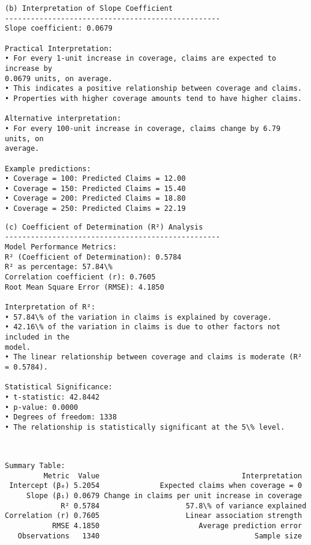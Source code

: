 \documentclass[8pt, twocolumn]{extarticle}
\begin{document}
    \begin{Verbatim}[commandchars=\\\{\}]
(b) Interpretation of Slope Coefficient
--------------------------------------------------
Slope coefficient: 0.0679

Practical Interpretation:
• For every 1-unit increase in coverage, claims are expected to increase by
0.0679 units, on average.
• This indicates a positive relationship between coverage and claims.
• Properties with higher coverage amounts tend to have higher claims.

Alternative interpretation:
• For every 100-unit increase in coverage, claims change by 6.79 units, on
average.

Example predictions:
• Coverage = 100: Predicted Claims = 12.00
• Coverage = 150: Predicted Claims = 15.40
• Coverage = 200: Predicted Claims = 18.80
• Coverage = 250: Predicted Claims = 22.19
    \end{Verbatim}
    \begin{Verbatim}[commandchars=\\\{\}]
(c) Coefficient of Determination (R²) Analysis
--------------------------------------------------
Model Performance Metrics:
R² (Coefficient of Determination): 0.5784
R² as percentage: 57.84\%
Correlation coefficient (r): 0.7605
Root Mean Square Error (RMSE): 4.1850

Interpretation of R²:
• 57.84\% of the variation in claims is explained by coverage.
• 42.16\% of the variation in claims is due to other factors not included in the
model.
• The linear relationship between coverage and claims is moderate (R² = 0.5784).

Statistical Significance:
• t-statistic: 42.8442
• p-value: 0.0000
• Degrees of freedom: 1338
• The relationship is statistically significant at the 5\% level.
    \end{Verbatim}
    \begin{center}
    \end{center}
    { \hspace*{\fill} \\}
    \begin{Verbatim}[commandchars=\\\{\}]
Summary Table:
         Metric  Value                                 Interpretation
 Intercept (β₀) 5.2054              Expected claims when coverage = 0
     Slope (β₁) 0.0679 Change in claims per unit increase in coverage
             R² 0.5784                    57.8\% of variance explained
Correlation (r) 0.7605                    Linear association strength
           RMSE 4.1850                       Average prediction error
   Observations   1340                                    Sample size
    \end{Verbatim}
\end{document}
